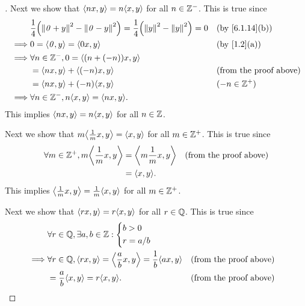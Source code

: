 \begin{proof}[]
  Next we show that \(\inn{nx, y} = n \inn{x, y}\) for all \(n \in \mathbb{Z}^-\).
  This is true since
  \begin{align*}
             & \frac{1}{4} \pa{\norm{\zv + y}^2 - \norm{\zv - y}^2} = \frac{1}{4} \pa{\norm{y}^2 - \norm{y}^2} = 0 &  & \by{6.1.14}[b]                \\
    \implies & 0 = \inn{\zv, y} = \inn{0x, y}                                                                      &  & \by{1.2}[a]                   \\
    \implies & \forall n \in \Z^-, 0 = \inn{(n + (-n)) x, y}                                                                                          \\
             & = \inn{nx, y} + \inn{(-n)x, y}                                                                      &  & \text{(from the proof above)} \\
             & = \inn{nx, y} + (-n) \inn{x, y}                                                                     &  & (-n \in \Z^+)                 \\
    \implies & \forall n \in \Z^-, n \inn{x, y} = \inn{nx, y}.
  \end{align*}
  This implies \(\inn{nx, y} = n \inn{x, y}\) for all \(n \in \mathbb{Z}\).

  Next we show that \(m \inn{\frac{1}{m} x, y} = \inn{x, y}\) for all \(m \in \mathbb{Z}^+\).
  This is true since
  \begin{align*}
    \forall m \in \Z^+, m \inn{\frac{1}{m} x, y} & = \inn{m \frac{1}{m} x, y} &  & \text{(from the proof above)} \\
                                                 & = \inn{x, y}.
  \end{align*}
  This implies \(\inn{\frac{1}{m} x, y} = \frac{1}{m} \inn{x, y}\) for all \(m \in \mathbb{Z}^+\).

  Next we show that \(\inn{rx, y} = r \inn{x, y}\) for all \(r \in \mathbb{Q}\).
  This is true since
  \begin{align*}
             & \forall r \in \Q, \exists a, b \in \Z : \begin{dcases}
                                                         b > 0 \\
                                                         r = a / b
                                                       \end{dcases}                                                               \\
    \implies & \forall r \in \Q, \inn{rx, y} = \inn{\frac{a}{b} x, y} = \frac{1}{b} \inn{ax, y} &  & \text{(from the proof above)} \\
             & = \frac{a}{b} \inn{x, y} = r \inn{x, y}.                                         &  & \text{(from the proof above)}
  \end{align*}


\end{proof}

